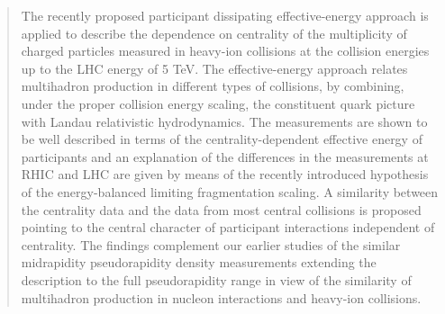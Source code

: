\documentclass[twocolumn,showpacs,preprintnumbers,prd,superscriptaddress,nofootinbib]{revtex4}
\begin{document}
%
 \begin{abstract} 
 The recently proposed participant dissipating effective-energy approach  
is applied to describe
  the dependence on centrality 
 of the  multiplicity 
  of charged particles measured in heavy-ion collisions at the collision 
 energies
  up to the 
 LHC energy of 5 TeV.
 The effective-energy approach relates multihadron production in different 
types of collisions, by combining, under the proper collision energy 
scaling,
  the constituent quark picture with Landau relativistic hydrodynamics.
  The measurements are shown to be well described in terms of the 
centrality-dependent effective energy of participants 
   and an explanation of the differences in the measurements at RHIC and 
LHC are given by means of the recently introduced hypothesis of the 
energy-balanced limiting fragmentation scaling.
 A similarity between the centrality data and the data from most central 
collisions is 
 proposed 
 pointing to the central character of participant 
interactions 
 independent of 
     centrality.
  The findings complement 
  our 
 earlier 
 studies
 of the similar midrapidity pseudorapidity 
density measurements 
       extending the 
 description to the full pseudorapidity range 
 in view of 
  the 
 similarity 
  of multihadron production
 in 
 nucleon interactions 
 and heavy-ion collisions. 

 \end{abstract}

\maketitle
\end{document}
